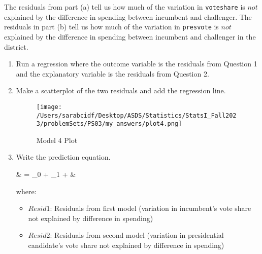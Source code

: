 \documentclass[12pt,letterpaper]{article}
\begin{document}
\noindent The residuals from part (a) tell us how much of the variation in \texttt{voteshare} is $not$ explained by the difference in spending between incumbent and challenger. The residuals in part (b) tell us how much of the variation in \texttt{presvote} is $not$ explained by the difference in spending between incumbent and challenger in the district.
	\begin{enumerate}
		\item Run a regression where the outcome variable is the residuals from Question 1 and the explanatory variable is the residuals from Question 2.	\vspace{0.5cm}
		
		
		
		\item Make a scatterplot of the two residuals and add the regression line. 	\vspace{0.5cm}
		
		
		
		\begin{figure}[H]
			\centering
			\texttt{[image: /Users/sarabcidf/Desktop/ASDS/Statistics/StatsI\_Fall2023/problemSets/PS03/my\_answers/plot4.png]}
			\caption{Model 4 Plot}
		\end{figure}
		
		\item Write the prediction equation.
		
		{\setlength{\abovedisplayskip}{2pt} 
			\setlength{\belowdisplayskip}{6pt} 
			
			\begin{flalign*}
				& = \beta_0 + \beta_1 \cdot {} + \varepsilon &
			\end{flalign*}
			
			where: 
			
			\begin{itemize}
				\item $Resid1$: Residuals from first model (variation in incumbent's vote share not explained by difference in spending)
				\item $Resid2$: Residuals from second model (variation in presidential candidate's vote share not explained by difference in spending)
			\end{itemize}
		}
		
	\end{enumerate}
	
\end{document}
